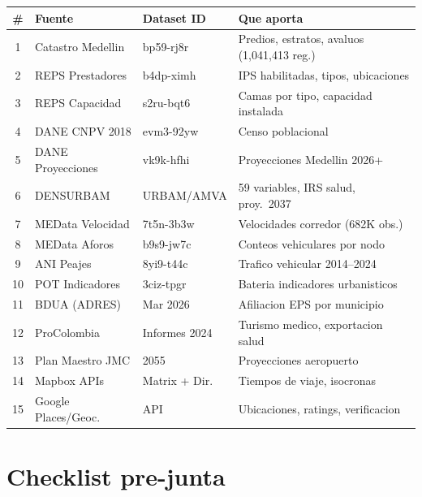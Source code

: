 \documentclass[11pt, a4paper]{article}
\begin{document}
{\small
\begin{tabular}{@{}clll@{}}
\toprule
\textbf{\#} & \textbf{Fuente} & \textbf{Dataset ID} & \textbf{Que aporta} \\
\midrule
\rowcolor{bglight}
1 & Catastro Medellin & bp59-rj8r & Predios, estratos, avaluos (1,041,413 reg.) \\
2 & REPS Prestadores & b4dp-ximh & IPS habilitadas, tipos, ubicaciones \\
\rowcolor{bglight}
3 & REPS Capacidad & s2ru-bqt6 & Camas por tipo, capacidad instalada \\
4 & DANE CNPV 2018 & evm3-92yw & Censo poblacional \\
\rowcolor{bglight}
5 & DANE Proyecciones & vk9k-hfhi & Proyecciones Medellin 2026+ \\
6 & DENSURBAM & URBAM/AMVA & 59 variables, IRS salud, proy.\ 2037 \\
\rowcolor{bglight}
7 & MEData Velocidad & 7t5n-3b3w & Velocidades corredor (682K obs.) \\
8 & MEData Aforos & b9s9-jw7c & Conteos vehiculares por nodo \\
\rowcolor{bglight}
9 & ANI Peajes & 8yi9-t44c & Trafico vehicular 2014--2024 \\
10 & POT Indicadores & 3ciz-tpgr & Bateria indicadores urbanisticos \\
\rowcolor{bglight}
11 & BDUA (ADRES) & Mar 2026 & Afiliacion EPS por municipio \\
12 & ProColombia & Informes 2024 & Turismo medico, exportacion salud \\
\rowcolor{bglight}
13 & Plan Maestro JMC & 2055 & Proyecciones aeropuerto \\
14 & Mapbox APIs & Matrix + Dir. & Tiempos de viaje, isocronas \\
\rowcolor{bglight}
15 & Google Places/Geoc. & API & Ubicaciones, ratings, verificacion \\
\bottomrule
\end{tabular}
}


\section{Checklist pre-junta}
\end{document}
